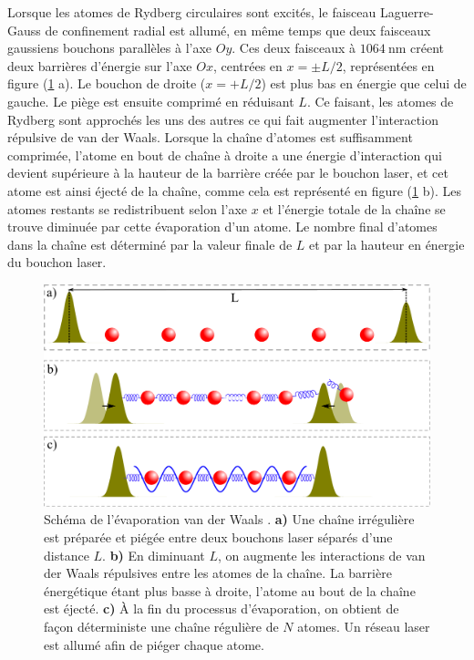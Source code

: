 Lorsque les atomes de Rydberg circulaires sont excités, le faisceau Laguerre-Gauss de confinement radial est allumé, en même temps que deux faisceaux gaussiens \og bouchons \fg{} parallèles à l'axe $Oy$.
Ces deux faisceaux à $\SI{1064}{\nano\meter}$ créent deux barrières d'énergie sur l'axe $Ox$, centrées en $x=\pm L/2$, représentées en figure (\ref{fig:plugs_evap} a).
Le bouchon de droite ($x=+L/2$) est plus bas en énergie que celui de gauche.
Le piège est ensuite comprimé en réduisant $L$.
Ce faisant, les atomes de Rydberg sont approchés les uns des autres ce qui fait augmenter l'interaction répulsive de van der Waals.
Lorsque la chaîne d'atomes est suffisamment comprimée, l'atome en bout de chaîne à droite a une énergie d'interaction qui devient supérieure à la hauteur de la barrière créée par le bouchon laser, et cet atome est ainsi éjecté de la chaîne, comme cela est représenté en figure (\ref{fig:plugs_evap} b).
Les atomes restants se redistribuent selon l'axe $x$ et l'énergie totale de la chaîne se trouve diminuée par cette \og évaporation \fg{} d'un atome.
Le nombre final d'atomes dans la chaîne est déterminé par la valeur finale de $L$ et par la hauteur en énergie du bouchon laser.
%
\begin{figure}[h]
\centering
\includegraphics[width=0.8\linewidth]{figures/circsim/plugs_evap}
\caption[Schéma de l'\og évaporation van der Waals \fg{} ]{
Schéma de l'\og évaporation van der Waals \fg{}.
\textbf{a)} Une chaîne irrégulière est préparée et piégée entre deux \og bouchons \fg{} laser séparés d'une distance $L$.
\textbf{b)} En diminuant $L$, on augmente les interactions de van der Waals répulsives entre les atomes de la chaîne.
La barrière énergétique étant plus basse à droite, l'atome au bout de la chaîne est éjecté.
\textbf{c)} \`A la fin du processus d'évaporation, on obtient de façon déterministe une chaîne régulière de $N$ atomes. Un réseau laser est allumé afin de piéger chaque atome.
}
\label{fig:plugs_evap}
\end{figure}
%

